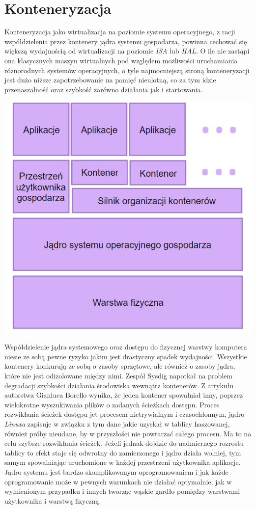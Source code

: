 \documentclass[polish, a4paper, 12pt, oneside]{book}
\begin{document}
	\section{Konteneryzacja}
	Konteneryzacja jako wirtualizacja na poziomie systemu operacyjnego, z racji współdzielenia przez kontenery jądra systemu gospodarza, powinna cechować się większą wydajnością od wirtualizacji na poziomie \textit{ISA} lub \textit{HAL}. O ile nie zastąpi ona klasycznych maszyn wirtualnych pod względem możliwości uruchamiania różnorodnych systemów operacyjnych, o tyle najmocniejszą stroną konteneryzacji jest dużo niższe zapotrzebowanie na pamięć nieulotną, co za tym idzie przenaszalność oraz szybkość zarówno działania jak i startowania. 
	\begin{center}
		\includegraphics[width=140mm]{schemat_kont.png}
	\end{center}
	Współdzielenie jądra systemowego oraz dostępu do fizycznej warstwy komputera niesie ze sobą pewne ryzyko jakim jest drastyczny spadek wydajności. Wszystkie kontenery konkurują ze sobą o zasoby sprzętowe, ale również o zasoby jądra, które nie jest odizolowane między nimi. Zespół Sysdig napotkał na problem degradacji szybkości działania środowiska wewnątrz kontenerów. Z artykułu autorstwa Gianluca Borello\cite{sd17} wynika, że jeden kontener spowalniał inny, poprzez wielokrotne wyszukiwania plików o zadanych ścieżkach dostępu. Proces rozwikłania ścieżek dostępu jet procesem nietrywialnym i czasochłonnym, jądro \textit{Linuxa} zapisuje w związku z tym dane jakie uzyskał w tablicy haszowanej, również próby nieudane, by w przyszłości nie powtarzać całego procesu. Ma to na celu szybsze rozwikłania ścieżek. Jeżeli jednak dojdzie do nadmiernego rozrostu tablicy to efekt staje się odwrotny do zamierzonego i jądro działa wolniej, tym samym spowalniając uruchomione w każdej przestrzeni użytkownika aplikacje. Jądro systemu jest bardzo skomplikowanym oprogramowaniem i jak każde oprogramowanie może w pewnych warunkach nie działać optymalnie, jak w wymienionym przypadku i innych tworząc wąskie gardło pomiędzy warstwami użytkownika i warstwą fizyczną.
	
\end{document}
